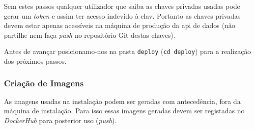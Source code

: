 Sem estes passos qualquer utilizador que saiba as chaves privadas usadas pode gerar um \textit{token} e assim ter acesso indevido à \acrshort{clav}. Portanto as chaves privadas devem estar apenas acessíveis na máquina de produção da \acrshort{api} de dados (não partilhe nem faça \textit{push} no repositório Git destas chaves).

Antes de avançar posicionamo-nos na pasta \texttt{deploy} (\verb|cd deploy|) para a realização dos próximos passos.

\subsubsection{Criação de Imagens}\label{sec:int-imagens}

As imagens usadas na instalação podem ser geradas com antecedência, fora da máquina de instalação. Para isso essas imagens geradas devem ser registadas no  \textit{DockerHub} para posterior uso (\textit{push}).

